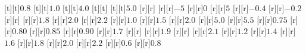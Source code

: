 \begin{psfrags}
[t][t]{$0.8$}%
[t][t]{$1.0$}%
[t][t]{$4.0$}%
[t][t]{}%
[t][t]{$5.0$}%
%
[r][r]{}%
[r][r]{$-5$}%
[r][r]{$0$}%
[r][r]{$5$}%
[r][r]{$-0.4$}%
[r][r]{$-0.2$}%
[r][r]{}%
[r][r]{$1.8$}%
[r][r]{$2.0$}%
[r][r]{$2.2$}%
[r][r]{$1.0$}%
[r][r]{$1.5$}%
[r][r]{$2.0$}%
[r][r]{$5.0$}%
[r][r]{$5.5$}%
[r][r]{$0.75$}%
[r][r]{$0.80$}%
[r][r]{$0.85$}%
[r][r]{$0.90$}%
[r][r]{$1.7$}%
[r][r]{}%
[r][r]{$1.9$}%
[r][r]{}%
[r][r]{$2.1$}%
[r][r]{$1.2$}%
[r][r]{$1.4$}%
[r][r]{$1.6$}%
[r][r]{$1.8$}%
[r][r]{$2.0$}%
[r][r]{$2.2$}%
[r][r]{$0.6$}%
[r][r]{$0.8$}%
%
%
\end{psfrags}%
%
